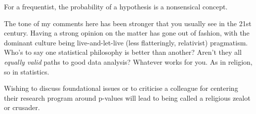 \documentclass[a4paper, 12pt]{article}
\begin{document}
For a frequentist, the probability of a hypothesis is a nonsensical concept.



The tone of my comments here has been stronger that you usually see in the
21st century. Having a strong opinion on the matter has gone out of fashion,
with the dominant culture being live-and-let-live (less flatteringly,
relativist) pragmatism. Who's to say one statistical philosophy is better than
another? Aren't they all {\it equally valid} paths to good data analysis?
Whatever works for you. As in religion, so in statistics.

Wishing to discuss foundational issues or to criticise
a colleague for centering their research program around p-values will lead to
being called a religious zealot or crusader.



\end{document}
